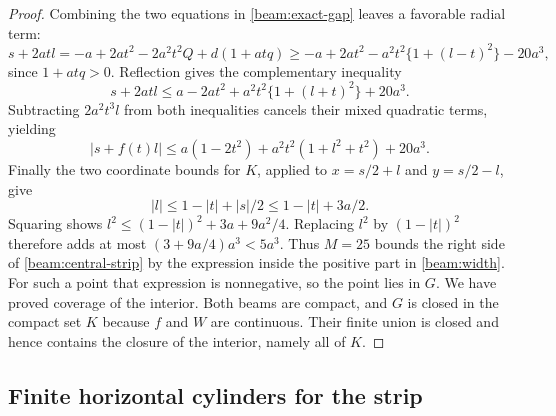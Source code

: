 \begin{proof}
Combining the two equations in \eqref{beam:exact-gap} leaves a favorable
radial term:
\[
 s+2atl=-a+2at^2-2a^2t^2Q+d(1+atq)
 \ge -a+2at^2-a^2t^2\{1+(l-t)^2\}-20a^3,
\]
since $1+atq>0$. Reflection gives the complementary inequality
\[
 s+2atl\le a-2at^2+a^2t^2\{1+(l+t)^2\}+20a^3.
\]
Subtracting $2a^2t^3l$ from both inequalities cancels their mixed
quadratic terms, yielding
\begin{equation}\label{beam:central-strip}
 |s+f(t)l|\le a(1-2t^2)+a^2t^2(1+l^2+t^2)+20a^3.
\end{equation}
Finally the two coordinate bounds for $K$, applied to
$x=s/2+l$ and $y=s/2-l$, give
\[
 |l|\le1-|t|+|s|/2\le1-|t|+3a/2.
\]
Squaring shows $l^2\le(1-|t|)^2+3a+9a^2/4$.
Replacing $l^2$ by $(1-|t|)^2$ therefore adds at most
$(3+9a/4)a^3<5a^3$. Thus $M=25$ bounds the right side of
\eqref{beam:central-strip} by the expression inside the positive part in
\eqref{beam:width}. For such a point that expression is nonnegative,
so the point lies in $G$. We have proved coverage of the interior.
Both beams are compact, and $G$ is closed in the compact set $K$ because
$f$ and $W$ are continuous. Their finite union is closed and hence
contains the closure of the interior, namely all of $K$.
\end{proof}

\subsection{Finite horizontal cylinders for the strip}

